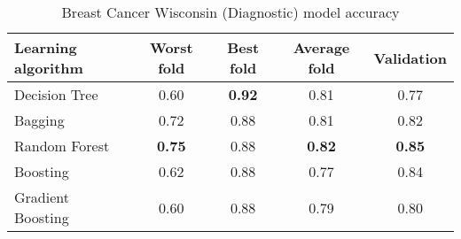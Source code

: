 \begin{table}[htbp]
    \centering
    \begin{tabular}{l c c c c}
    \toprule
    Learning algorithm  & Worst fold     & Best fold     & Average fold  & Validation    \\
    \midrule
    Decision Tree       &  0.60          & \textbf{0.92} & 0.81          & 0.77          \\
    Bagging             &  0.72          & 0.88          & 0.81          & 0.82          \\
    Random Forest       &  \textbf{0.75} & 0.88          & \textbf{0.82} & \textbf{0.85} \\
    Boosting            &  0.62          & 0.88          & 0.77          & 0.84          \\
    Gradient Boosting   &  0.60          & 0.88          & 0.79          & 0.80          \\
    \bottomrule
    \end{tabular}
    \caption{Breast Cancer Wisconsin (Diagnostic) model accuracy}
\end{table}